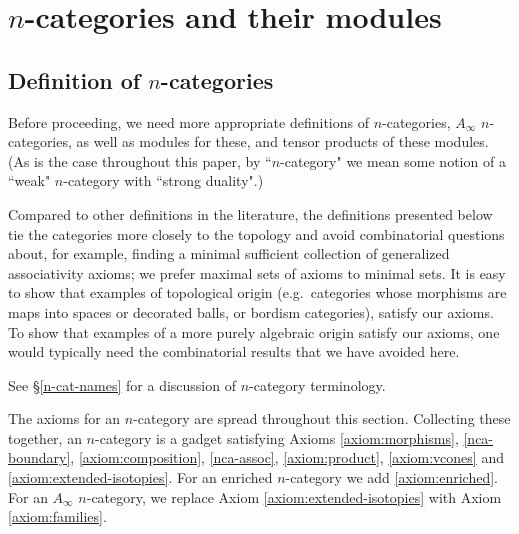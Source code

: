 
\def\xxpar#1#2{\smallskip\noindent{\bf #1} {\it #2} \smallskip}
\def\mmpar#1#2#3{\smallskip\noindent{\bf #1} (#2). {\it #3} \smallskip}

\section{\texorpdfstring{$n$}{n}-categories and their modules}
\label{sec:ncats}

\subsection{Definition of \texorpdfstring{$n$}{n}-categories}
\label{ss:n-cat-def}

Before proceeding, we need more appropriate definitions of $n$-categories, 
$A_\infty$ $n$-categories, as well as modules for these, and tensor products of these modules.
(As is the case throughout this paper, by ``$n$-category" we mean some notion of
a ``weak" $n$-category with ``strong duality".)

Compared to other definitions in the literature,
the definitions presented below tie the categories more closely to the topology
and avoid combinatorial questions about, for example, finding a minimal sufficient
collection of generalized associativity axioms; we prefer maximal sets of axioms to minimal sets.
It is easy to show that examples of topological origin
(e.g.\ categories whose morphisms are maps into spaces or decorated balls, or bordism categories), 
satisfy our axioms.
To show that examples of a more purely algebraic origin satisfy our axioms, 
one would typically need the combinatorial
results that we have avoided here.

See \S\ref{n-cat-names} for a discussion of $n$-category terminology.


\medskip

The axioms for an $n$-category are spread throughout this section.
Collecting these together, an $n$-category is a gadget satisfying Axioms \ref{axiom:morphisms}, 
\ref{nca-boundary}, \ref{axiom:composition},  \ref{nca-assoc}, \ref{axiom:product}, \ref{axiom:vcones} and 
\ref{axiom:extended-isotopies}.
For an enriched $n$-category we add \ref{axiom:enriched}.
For an $A_\infty$ $n$-category, we replace 
Axiom \ref{axiom:extended-isotopies} with Axiom \ref{axiom:families}.

